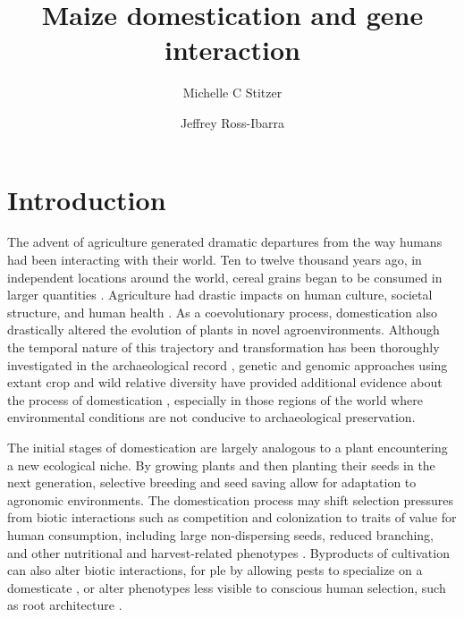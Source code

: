 \documentclass[9pt,twocolumn,twoside]{rilabRxiv}
\title{Maize domestication and gene interaction}
\author[$\ast$,1]{Michelle C Stitzer}
\author[$\ast,\dagger$]{Jeffrey Ross-Ibarra}
\affil[$\ast$]{Dept. of Plant Sciences and Center for Population Biology, University of California, Davis, CA, USA}
\affil[$\dagger$]{Genome Center, University of California, Davis, CA, USA}
\begin{document}
\maketitle




\section*{Introduction}

The advent of agriculture generated dramatic departures from the way humans had been interacting with their world.
Ten to twelve thousand years ago, in independent locations around the world, cereal grains began to be consumed in larger quantities \citep{larson2014}.
Agriculture had drastic impacts on human culture, societal structure, and human health \citep{larsen2006}.
As a coevolutionary process, domestication also drastically altered the evolution of plants in novel agroenvironments.
Although the temporal nature of this trajectory and transformation has been thoroughly investigated in the archaeological record \citep{smith2001}, genetic and genomic approaches using extant crop and wild relative diversity have provided additional evidence about the process of domestication \citep{zeder2006}, especially in those regions of the world where environmental conditions are not conducive to archaeological preservation.

The initial stages of domestication are largely analogous to a plant encountering a new ecological niche.
By growing plants and then planting their seeds in the next generation, selective breeding and seed saving allow for adaptation to agronomic environments.
The domestication process may shift selection pressures from biotic interactions such as competition and colonization to traits of value for human consumption, including large non-dispersing seeds, reduced branching, and other nutritional and harvest-related phenotypes \citep{doebley2006}.
Byproducts of cultivation can also alter biotic interactions, for ple by allowing pests to specialize on a domesticate \citep{bernal2018, gaillard2018}, or alter phenotypes less visible to conscious human selection, such as root architecture \citep{burton2013}.
\end{document}

